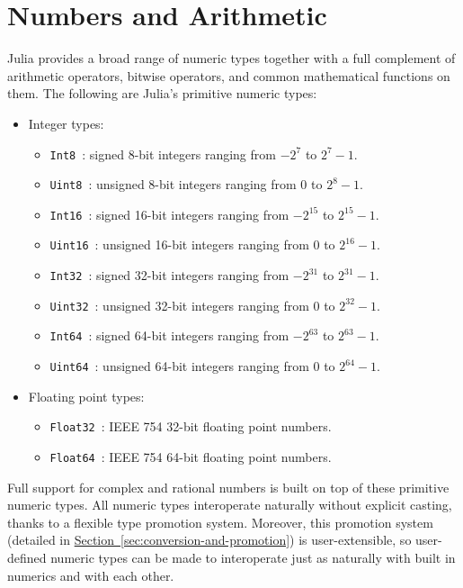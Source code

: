 \documentclass{article}
\renewcommand{\sec}[1]{\label{sec:#1}}
\newcommand{\Section}[1]{\hyperref[sec:#1]{Section~\ref*{sec:#1}}}
\begin{document}
\section{Numbers and Arithmetic}\sec{numbers-and-arithmetic}

Julia provides a broad range of numeric types together with a full complement of arithmetic operators, bitwise operators, and common mathematical functions on them.
The following are Julia's primitive numeric types:
\begin{itemize}
  \item Integer types:
  \begin{itemize}
    \item \verb|Int8|~: signed 8-bit integers ranging from $-2^7$ to $2^7-1$.
    \item \verb|Uint8|~: unsigned 8-bit integers ranging from 0 to $2^8-1$.
    \item \verb|Int16|~: signed 16-bit integers ranging from $-2^{15}$ to $2^{15}-1$.
    \item \verb|Uint16|~: unsigned 16-bit integers ranging from 0 to $2^{16}-1$.
    \item \verb|Int32|~: signed 32-bit integers ranging from $-2^{31}$ to $2^{31}-1$.
    \item \verb|Uint32|~: unsigned 32-bit integers ranging from 0 to $2^{32}-1$.
    \item \verb|Int64|~: signed 64-bit integers ranging from $-2^{63}$ to $2^{63}-1$.
    \item \verb|Uint64|~: unsigned 64-bit integers ranging from 0 to $2^{64}-1$.
  \end{itemize}
  \item Floating point types:
  \begin{itemize}
    \item \verb|Float32|~: IEEE 754 32-bit floating point numbers.
    \item \verb|Float64|~: IEEE 754 64-bit floating point numbers.
  \end{itemize}
\end{itemize}
Full support for complex and rational numbers is built on top of these primitive numeric types.
All numeric types interoperate naturally without explicit casting, thanks to a flexible type promotion system.
Moreover, this promotion system (detailed in \Section{conversion-and-promotion}) is user-extensible, so user-defined numeric types can be made to interoperate just as naturally with built in numerics and with each other.
\end{document}
